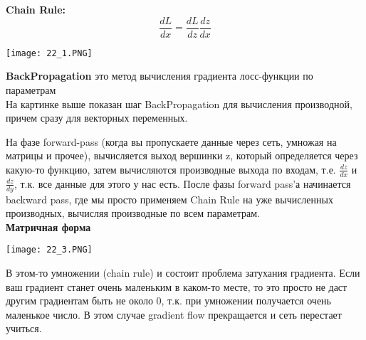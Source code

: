 \textbf{Chain Rule:}
$$\frac{dL}{dx} = \frac{dL}{dz}\frac{dz}{dx}$$ 
\begin{center}
    \texttt{[image: 22\_1.PNG]}
\end{center}
\textbf{BackPropagation} это метод вычисления градиента лосс-функции по параметрам\\

На картинке выше показан шаг BackPropagation для вычисления производной, причем сразу для векторных переменных.

На фазе forward-pass (когда вы пропускаете данные через сеть, умножая на матрицы и прочее), вычисляется выход
вершинки z, который определяется через какую-то функцию, затем вычисляются производные выхода по входам, т.е. $\frac{dz}{dx}$ и $\frac{dz}{dy}$, т.к. все данные для этого у нас есть.
После фазы forward pass’а начинается backward pass, где мы просто применяем Chain Rule на уже вычисленных
производных, вычисляя производные по всем параметрам.
\\

\textbf{Матричная форма}
\begin{center}
    \texttt{[image: 22\_3.PNG]}
\end{center}

В этом-то умножении (chain rule) и состоит проблема затухания
градиента. Если ваш градиент станет очень маленьким в каком-то месте, то это просто не даст другим градиентам быть не
около 0, т.к. при умножении получается очень маленькое число. В этом случае gradient flow прекращается и сеть перестает
учиться. 
